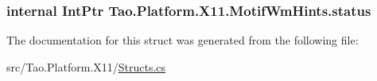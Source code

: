 \label{struct_tao_1_1_platform_1_1_x11_1_1_motif_wm_hints_a9dbd248379d35767158c1f96fc9c6701}
\hypertarget{struct_tao_1_1_platform_1_1_x11_1_1_motif_wm_hints_af2b9cd8dea35b6ef2a230355c34273cd}{
\subsubsection[{status}]{\setlength{\rightskip}{0pt plus 5cm}internal IntPtr {\bf Tao.Platform.X11.MotifWmHints.status}}}
\label{struct_tao_1_1_platform_1_1_x11_1_1_motif_wm_hints_af2b9cd8dea35b6ef2a230355c34273cd}


The documentation for this struct was generated from the following file:\begin{DoxyCompactItemize}
\item 
src/Tao.Platform.X11/\hyperlink{_structs_8cs}{Structs.cs}\end{DoxyCompactItemize}
